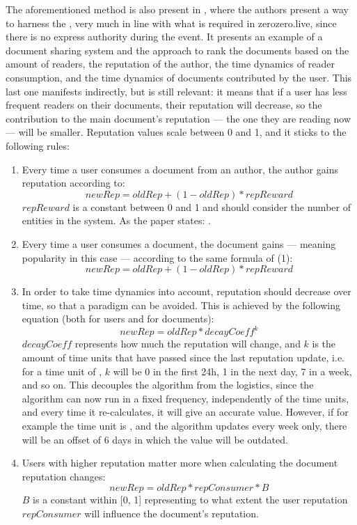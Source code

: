 The aforementioned method is also present in \cite{Daly2009}, where the authors present a way to harness the , very much in line with what is required in zerozero.live, since there is no express authority during the event. It presents an example of a document sharing system and the approach to rank the documents based on the amount of readers, the reputation of the author, the time dynamics of reader consumption, and the time dynamics of documents contributed by the user. This last one manifests indirectly, but is still relevant: it means that if a user has less frequent readers on their documents, their reputation will decrease, so the contribution to the main document's reputation --- the one they are reading now --- will be smaller.
Reputation values scale between 0 and 1, and it sticks to the following rules:
\begin{enumerate}
    \item Every time a user consumes a document from an author, the author gains reputation according to:
    \[newRep = oldRep + (1 - oldRep) * repReward\]
    $repReward$ is a constant between 0 and 1 and should consider the number of entities in the system. As the paper states: .
    \item Every time a user consumes a document, the document gains  --- meaning popularity in this case --- according to the same formula of (1):
    \[newRep = oldRep + (1 - oldRep) * repReward\]
    \item In order to take time dynamics into account, reputation should decrease over time, so that a  paradigm can be avoided. This is achieved by the following equation (both for users and for documents):
    \[newRep = oldRep * decayCoeff^k\]
    $decayCoeff$ represents how much the reputation will change, and $k$ is the amount of time units that have passed since the last reputation update, i.e. for a time unit of , $k$ will be 0 in the first 24h, 1 in the next day, 7 in a week, and so on. This decouples the algorithm from the logistics, since the algorithm can now run in a fixed frequency, independently of the time units, and every time it re-calculates, it will give an accurate value. However, if for example the time unit is , and the algorithm updates every week only, there will be an offset of 6 days in which the value will be outdated.
    \item Users with higher reputation matter more when calculating the document reputation changes:
    \[newRep = oldRep * repConsumer * B\]
    $B$ is a constant within [0, 1] representing to what extent the user reputation $repConsumer$ will influence the document's reputation.


\end{enumerate}
